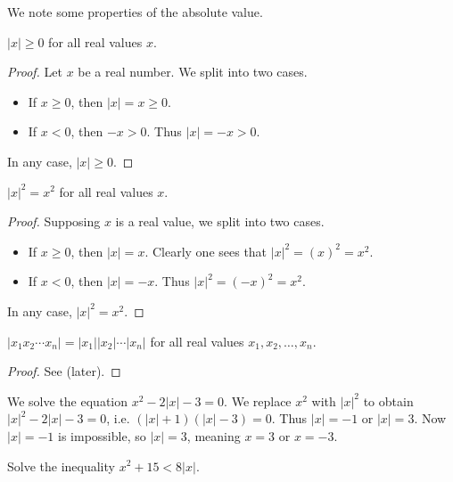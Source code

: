 We note some properties of the absolute value.
\begin{proposition}
    $|x| \geq 0$ for all real values $x$.
\end{proposition}
\begin{proof}
    Let $x$ be a real number. We split into two cases.
    \begin{itemize}
        \item If $x \geq 0$, then $|x| = x \geq 0$.
        \item If $x < 0$, then $-x > 0$. Thus $|x| = -x > 0$.
    \end{itemize}
    In any case, $|x| \geq 0$.
\end{proof}

\begin{proposition}
    $|x|^2 = x^2$ for all real values $x$.
\end{proposition}
\begin{proof}
    Supposing $x$ is a real value, we split into two cases.
    \begin{itemize}
        \item If $x \geq 0$, then $|x| = x$. Clearly one sees that $|x|^2 = (x)^2 = x^2$.
        \item If $x < 0$, then $|x| = -x$. Thus $|x|^2 = (-x)^2 = x^2$.
    \end{itemize}
    In any case, $|x|^2 = x^2$.
\end{proof}

\begin{proposition}
    $|x_1x_2\cdots x_n| = |x_1||x_2|\cdots|x_n|$ for all real values $x_1, x_2, \dots, x_n$.
\end{proposition}
\begin{proof}
    See  (later).
\end{proof}

\begin{example}
    We solve the equation $x^2 - 2|x| - 3 = 0$. We replace $x^2$ with $|x|^2$ to obtain $|x|^2 - 2|x| - 3 = 0$, i.e. $(|x|+1)(|x|-3) = 0$. Thus $|x| = -1$ or $|x| = 3$. Now $|x| = -1$ is impossible, so $|x| = 3$, meaning $x = 3$ or $x = -3$.
\end{example}

\begin{exercise}
    Solve the inequality $x^2 + 15 < 8|x|$.
\end{exercise}

